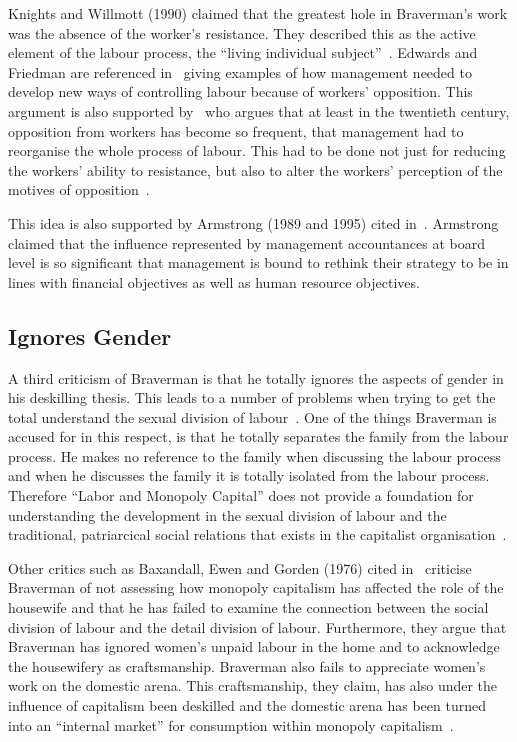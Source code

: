 \documentclass[a4paper,12pt,titlepage]{article}
\begin{document}
  Knights and Willmott (1990) claimed that the greatest hole in
  Braverman's work was the absence of the worker's resistance. They described
  this as the active element of the labour process,
  the ``living individual subject''~\cite[53]{ptcs}. Edwards and Friedman are
  referenced in~\cite[16]{sw} giving examples of how management needed
  to develop new ways of controlling labour because of workers' opposition.
  This argument is also supported by~\cite{re} who argues that at least
  in the twentieth century, opposition from workers has become so frequent,
  that management had to reorganise the whole process of labour. This
  had to be done not just for reducing the workers' ability to resistance, but
  also to alter the workers' perception of the motives of opposition~\cite[16]{re}. 

  This idea is also supported by Armstrong (1989 and 1995) cited
  in~\cite[155]{mnpb}. Armstrong claimed that the influence represented
  by management accountances at board level is so significant that
  management is bound to rethink their strategy to be in lines
  with financial objectives as well as human resource objectives.

  \subsection{Ignores Gender}
  A third criticism of Braverman is that he totally ignores the
  aspects of gender in his deskilling thesis.
  This leads to a number of problems when trying to get the total
  understand the sexual division of labour~\cite[54]{vb}. One of the
  things Braverman is accused for in this respect, is that he totally separates the
  family from the labour process. He makes no reference to the family
  when discussing the labour process and when he discusses the family it
  is totally isolated from the labour process. Therefore
  ``Labor and Monopoly Capital'' does not provide a foundation for
  understanding the development in the sexual division of labour
  and the traditional, patriarcical social relations that exists
  in the capitalist organisation~\cite[71]{vb}.

  Other critics such as Baxandall, Ewen and Gorden (1976) cited
  in~\cite{vb} criticise Braverman of not assessing how monopoly capitalism
  has affected the role of the housewife and that he has failed to
  examine the connection between the social division of labour
  and the detail division of labour. Furthermore, they argue that
  Braverman has ignored women's unpaid labour in the home and to
  acknowledge the housewifery as craftsmanship. Braverman also
  fails to appreciate women's work on the domestic arena.
  This craftsmanship, they claim,
  has also under the influence of capitalism been deskilled and the
  domestic arena has been turned into an ``internal market'' for
  consumption within monopoly capitalism~\cite[54]{vb}.
\end{document}

